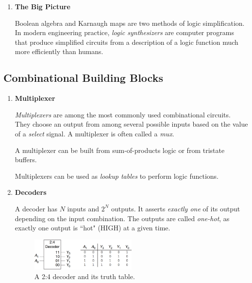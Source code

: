 \documentclass[12pt]{article}
\begin{document}
\begin{enumerate}
  \item \textbf{The Big Picture}

  Boolean algebra and Karnaugh maps are two methods of logic simplification. In modern engineering practice, \textit{logic synthesizers} are computer programs that produce simplified circuits from a description of a logic function much more efficiently than humans.
\end{enumerate}

\subsection{Combinational Building Blocks}

\begin{enumerate}
  \item \textbf{Multiplexer}

  \textit{Multiplexers} are among the most commonly used combinational circuits. They choose an output from among several possible inputs based on the value of a \textit{select} signal. A multiplexer is often called a \textit{mux}.

  A multiplexer can be built from sum-of-products logic or from tristate buffers.

  Multiplexers can be used as \textit{lookup tables} to perform logic functions.

  \item \textbf{Decoders}

  A decoder has $N$ inputs and $2^N$ outputs. It asserts \textit{exactly one} of its output depending on the input combination. The outputs are called \textit{one-hot}, as exactly one output is ``hot" (HIGH) at a given time.

  \begin{figure}[h]
    \centering
    \includegraphics[width=0.5\textwidth]{decoder.png}
    \caption{A 2:4 decoder and its truth table.}
    \label{figure:7}
  \end{figure}
\end{enumerate}
\end{document}
